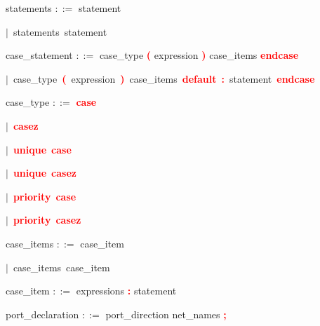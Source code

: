 \vspace{1em}
\noindent
\settowidth{\parindent}{\hspace{4ex}}
statements $::=$\hspace{1ex} statement

\mbox{$|$ statements statement}

\vspace{1em}
\noindent
\settowidth{\parindent}{\hspace{4ex}}
case\_statement $::=$\hspace{1ex} case\_type \textbf{\textcolor{red}{(}} expression \textbf{\textcolor{red}{)}} case\_items \textbf{\textcolor{red}{endcase}}

\mbox{$|$ case\_type \textbf{\textcolor{red}{(}} expression \textbf{\textcolor{red}{)}} case\_items \textbf{\textcolor{red}{default}} \textbf{\textcolor{red}{:}} statement \textbf{\textcolor{red}{endcase}}}

\vspace{1em}
\noindent
\settowidth{\parindent}{\hspace{4ex}}
case\_type $::=$\hspace{1ex} \textbf{\textcolor{red}{case}}

\mbox{$|$ \textbf{\textcolor{red}{casez}}}

\mbox{$|$ \textbf{\textcolor{red}{unique}} \textbf{\textcolor{red}{case}}}

\mbox{$|$ \textbf{\textcolor{red}{unique}} \textbf{\textcolor{red}{casez}}}

\mbox{$|$ \textbf{\textcolor{red}{priority}} \textbf{\textcolor{red}{case}}}

\mbox{$|$ \textbf{\textcolor{red}{priority}} \textbf{\textcolor{red}{casez}}}

\vspace{1em}
\noindent
\settowidth{\parindent}{\hspace{4ex}}
case\_items $::=$\hspace{1ex} case\_item

\mbox{$|$ case\_items case\_item}

\vspace{1em}
\noindent
\settowidth{\parindent}{\hspace{4ex}}
case\_item $::=$\hspace{1ex} expressions \textbf{\textcolor{red}{:}} statement

\vspace{1em}
\noindent
\settowidth{\parindent}{\hspace{4ex}}
port\_declaration $::=$\hspace{1ex} port\_direction net\_names \textbf{\textcolor{red}{;}}

